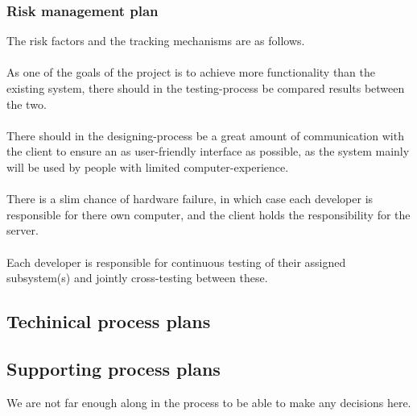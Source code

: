\documentclass[12pt]{article}
\begin{document}
\subsubsection{Risk management plan}
The risk factors and the tracking mechanisms are as follows. \\\\
As one of the goals of the project is to achieve more functionality than the existing system, there should in the testing-process be compared results between the two. \\\\
There should in the designing-process be a great amount of communication with the client to ensure an as user-friendly interface as possible, as the system mainly will be used by people with limited computer-experience. \\\\
There is a slim chance of hardware failure, in which case each developer is responsible for there own computer, and the client holds the responsibility for the server. \\\\
Each developer is responsible for continuous testing of their assigned subsystem(s) and jointly cross-testing between these. 
\subsection{Techinical process plans}
\subsection{Supporting process plans}
We are not far enough along in the process to be able to make any decisions here.
\end{document}
